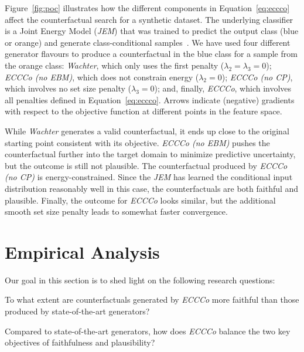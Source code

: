 Figure~\ref{fig:poc} illustrates how the different components in Equation~\ref{eq:eccco} affect the counterfactual search for a synthetic dataset. The underlying classifier is a Joint Energy Model (\textit{JEM}) that was trained to predict the output class (blue or orange) and generate class-conditional samples~\citep{grathwohl2020your}. We have used four different generator flavours to produce a counterfactual in the blue class for a sample from the orange class: \textit{Wachter}, which only uses the first penalty ($\lambda_2=\lambda_3=0$); \textit{ECCCo (no EBM)}, which does not constrain energy ($\lambda_2=0$); \textit{ECCCo (no CP)}, which involves no set size penalty ($\lambda_3=0$); and, finally, \textit{ECCCo}, which involves all penalties defined in Equation~\ref{eq:eccco}. Arrows indicate (negative) gradients with respect to the objective function at different points in the feature space. 

While \textit{Wachter} generates a valid counterfactual, it ends up close to the original starting point consistent with its objective. \textit{ECCCo (no EBM)} pushes the counterfactual further into the target domain to minimize predictive uncertainty, but the outcome is still not plausible. The counterfactual produced by \textit{ECCCo (no CP)} is energy-constrained. Since the \textit{JEM} has learned the conditional input distribution reasonably well in this case, the counterfactuals are both faithful and plausible. Finally, the outcome for \textit{ECCCo} looks similar, but the additional smooth set size penalty leads to somewhat faster convergence. 

\section{Empirical Analysis}\label{emp}

Our goal in this section is to shed light on the following research questions:

\begin{question}[Faithfulness]\label{rq:faithfulness}
  To what extent are counterfactuals generated by \textit{ECCCo} more faithful than those produced by state-of-the-art generators?
\end{question}

\begin{question}\label{rq:plausibility}
  Compared to state-of-the-art generators, how does \textit{ECCCo} balance the two key objectives of faithfulness and plausibility?
\end{question}

